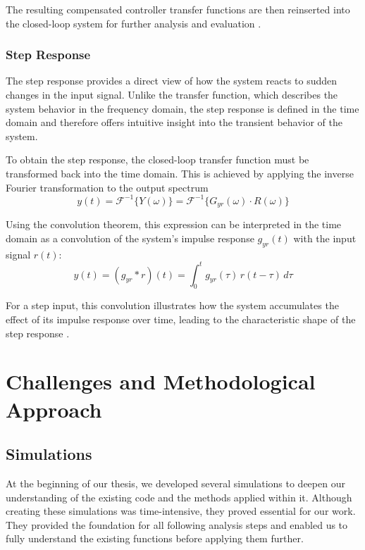 \documentclass[a4paper,11pt]{scrartcl}
\begin{document}
The resulting compensated controller transfer functions are then reinserted into the closed-loop system for further analysis and evaluation \parencite{bf_compITerm}.

\subsubsection*{Step Response}
The step response provides a direct view of how the system reacts to sudden changes in the input signal. Unlike the transfer function, which describes the system behavior in the frequency domain, the step response is defined in the time domain and therefore offers intuitive insight into the transient behavior of the system.

To obtain the step response, the closed-loop transfer function must be transformed back into the time domain. This is achieved by applying the inverse Fourier transformation to the output spectrum
\begin{equation}
	y(t) = \mathcal{F}^{-1}\{Y(\omega)\}
	= \mathcal{F}^{-1}\{G_{yr}(\omega)\cdot R(\omega)\}
\end{equation}

Using the convolution theorem, this expression can be interpreted in the time domain as a convolution of the system's impulse response $g_{yr}(t)$ with the input signal $r(t)$:
\begin{equation}
	y(t) = (g_{yr} * r)(t)
	= \int_{0}^{t} g_{yr}(\tau)\, r(t-\tau)\, d\tau
\end{equation}

For a step input, this convolution illustrates how the system accumulates the effect of its impulse response over time, leading to the characteristic shape of the step response \parencite{dortClosedLoopAnalysis}.

\clearpage

\section{Challenges and Methodological Approach}
\label{sec:ChallengesAndMethodologicalApproach}

\subsection{Simulations}
At the beginning of our thesis, we developed several simulations to deepen our understanding of the existing code and the methods applied within it. Although creating these simulations was time-intensive, they proved essential for our work. They provided the foundation for all following analysis steps and enabled us to fully understand the existing functions before applying them further.
\end{document}
